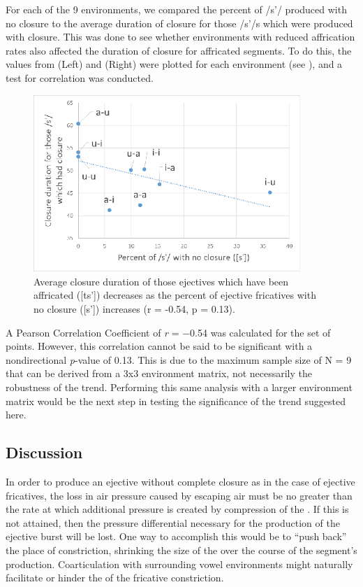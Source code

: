 \documentclass[output=paper
,newtxmath
,modfonts
,nonflat]{langsci/langscibook}
\begin{document}
For each of the 9 environments, we compared the percent of /s’/ produced with no closure to the average duration of closure for those /s’/s which were produced with closure. This was done to see whether environments with reduced affrication rates also affected the duration of closure for affricated segments. To do this, the values from  (Left) and  (Right) were plotted for each environment (see ), and a test for correlation was conducted.

 


\begin{figure}
\includegraphics[width=0.9\textwidth]{figures/fig-moeng-2.svg}
\caption{Average closure duration of those ejectives which have been affricated ([ts’]) decreases as the percent of ejective fricatives with no closure ([s’]) increases (r = -0.54, p = 0.13).}
\label{fig:moeng:3}
\end{figure}

A Pearson Correlation Coefficient of \textit{r} = −0.54 was calculated for the set of points. However, this correlation cannot be said to be significant with a nondirectional \textit{p}{}-value of 0.13. This is due to the maximum sample size of N = 9 that can be derived from a 3x3 environment matrix, not necessarily the robustness of the trend. Performing this same analysis with a larger environment matrix would be the next step in testing the significance of the trend suggested here.

\subsection{Discussion}\label{sec:moeng:5.4}

In order to produce an ejective without complete closure as in the case of ejective fricatives, the loss in air pressure caused by escaping air must be no greater than the rate at which additional pressure is created by compression of the . If this is not attained, then the pressure differential necessary for the production of the ejective burst will be lost. One way to accomplish this would be to “push back” the place of constriction, shrinking the size of the  over the course of the segment’s production. Coarticulation with surrounding vowel environments might naturally facilitate or hinder the  of the fricative constriction. 
\end{document}
